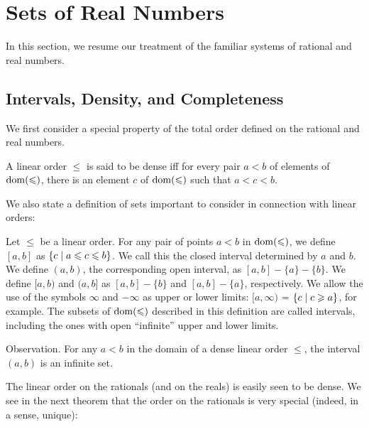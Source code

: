 \chapter{Sets of Real Numbers}

In this section, we resume our treatment of the familiar systems of
rational and real numbers.

\section{Intervals, Density, and Completeness}

We first consider a special property of the total order
defined on the rational and real numbers.

\begin{definition}
 A linear order $\leq$
 is said to be {\upshape dense} 
 iff for every pair $a < b$ of elements of $\mathop{\mathrm{dom}}(\leqslant)$, there is an
 element $c$ of $\mathop{\mathrm{dom}}(\leqslant)$ such that $a < c < b$.
\end{definition}

We also state a definition of sets important to consider in connection
with linear orders:

\begin{definition}
 Let $\leq$ be a linear order.  For any pair of
 points $a < b$ in $\mathop{\mathrm{dom}}(\leqslant)$, we define $[a,b]$ as $\{c \mid a \leqslant c
 \leqslant b\}$.  We call this the {\upshape closed interval} determined by $a$
 and $b$.  We define $(a,b)$, the corresponding {\upshape open interval},
 as $[a,b]-\{a\}-\{b\}$.  We define $[a,b)$ and $(a,b]$ as
 $[a,b]-\{b\}$ and $[a,b]-\{a\}$, respectively.  We allow the use of
 the symbols $\infty$ and $-\infty$ as upper or lower limits:
 $[a,\infty)$ = $\{c \mid c \geqslant a\}$, for example. The subsets
 of $\mathop{\mathrm{dom}}(\leqslant)$ described in this definition are called {\upshape
 intervals}, including the ones with open ``infinite'' upper and lower limits.
\end{definition}

\begin{ThmEtc}{Observation.}
 For any $a < b$ in the domain of a dense linear
 order $\leq$, the interval $(a,b)$ is an infinite set.
\end{ThmEtc}

The linear order on the rationals (and on the reals) is easily seen to 
be dense.  We see in the next theorem that the order on the rationals
is very special (indeed, in a sense, unique):

